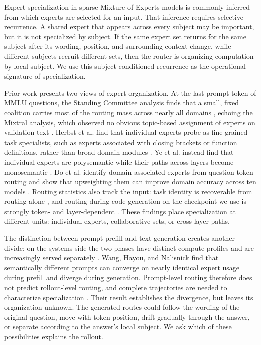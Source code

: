 \documentclass[10pt,twocolumn]{article}
\begin{document}
Expert specialization in sparse Mixture-of-Experts models \citep{jacobs1991adaptive,shazeer2017outrageously,fedus2022switch,dai2024deepseekmoe} is commonly inferred from which experts are selected for an input. That inference requires selective recurrence. A shared expert that appears across every subject may be important, but it is not specialized by subject. If the same expert set returns for the same subject after its wording, position, and surrounding context change, while different subjects recruit different sets, then the router is organizing computation by local subject. We use this subject-conditioned recurrence as the operational signature of specialization.

Prior work presents two views of expert organization. At the last prompt token of MMLU questions, the Standing Committee analysis finds that a small, fixed coalition carries most of the routing mass across nearly all domains \citep{wang2026standingcommittee}, echoing the Mixtral analysis, which observed no obvious topic-based assignment of experts on validation text \citep{jiang2024mixtral}. Herbst et al. find that individual experts probe as fine-grained task specialists, such as experts associated with closing brackets or function definitions, rather than broad domain modules \citep{herbst2026expertstrikesback}. Ye et al. instead find that individual experts are polysemantic while their paths across layers become monosemantic \citep{ye2026polysemantic}. Do et al. identify domain-associated experts from question-token routing and show that upweighting them can improve domain accuracy across ten models \citep{do2026domainexperts}. Routing statistics also track the input: task identity is recoverable from routing alone \citep{mynampati2026taskconditioned}, and routing during code generation on the checkpoint we use is strongly token- and layer-dependent \citep{hayashi2026layerwise}. These findings place specialization at different units: individual experts, collaborative sets, or cross-layer paths.

The distinction between prompt prefill and text generation creates another divide; on the systems side the two phases have distinct compute profiles and are increasingly served separately \citep{kwon2023pagedattention,zhong2024distserve}. Wang, Hayou, and Nalisnick find that semantically different prompts can converge on nearly identical expert usage during prefill and diverge during generation. Prompt-level routing therefore does not predict rollout-level routing, and complete trajectories are needed to characterize specialization \citep{wang2026myth}. Their result establishes the divergence, but leaves its organization unknown. The generated routes could follow the wording of the original question, move with token position, drift gradually through the answer, or separate according to the answer's local subject. We ask which of these possibilities explains the rollout.
\end{document}
